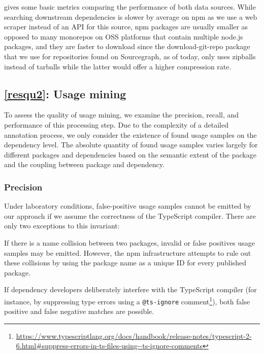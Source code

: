  gives some basic metrics comparing the performance of both data sources.
While searching downstream dependencies is slower by average on npm as we use a web scraper instead of an API for this source, npm packages are usually smaller as opposed to many monorepos on OSS platforms that contain multiple node.js packages, and they are faster to download since the download-git-repo package that we use for repositories found on Sourcegraph, as of today, only uses zipballs instead of tarballs while the latter would offer a higher compression rate.

\subsection{\ref{resqu2}: Usage mining}
\label{sec:evaluation/resqu2}

To assess the quality of usage mining, we examine the precision, recall, and performance of this processing step.
Due to the complexity of a detailed annotation process, we only consider the existence of found usage samples on the dependency level.
The absolute quantity of found usage samples varies largely for different packages and dependencies based on the semantic extent of the package and the coupling between package and dependency.

\subsubsection{Precision}
\label{sec:evaluation/resqu2/precision}

Under laboratory conditions, false-positive usage samples cannot be emitted by our approach if we assume the correctness of the TypeScript compiler.
There are only two exceptions to this invariant:
\begin{enumerate*}[label=(\roman*)]
	\item If there is a name collision between two packages, invalid or false positives usage samples may be emitted.
		However, the npm infrastructure attempts to rule out these collisions by using the package name as a unique ID for every published package.
	\item If dependency developers deliberately interfere with the TypeScript compiler (for instance, by suppressing type errors using a \verb|@ts-ignore| comment\footnote{\url{https://www.typescriptlang.org/docs/handbook/release-notes/typescript-2-6.html\#suppress-errors-in-ts-files-using--ts-ignore-comments}}), both false positive and false negative matches are possible.
\end{enumerate*}

